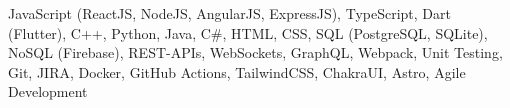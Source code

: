 JavaScript (ReactJS, NodeJS, AngularJS, ExpressJS), TypeScript, Dart (Flutter), C++, Python, Java, C\#, HTML, CSS, SQL (PostgreSQL, SQLite), NoSQL (Firebase), REST-APIs, WebSockets, GraphQL, Webpack,  Unit Testing, Git, JIRA, Docker, GitHub Actions, TailwindCSS, ChakraUI, Astro, Agile Development
